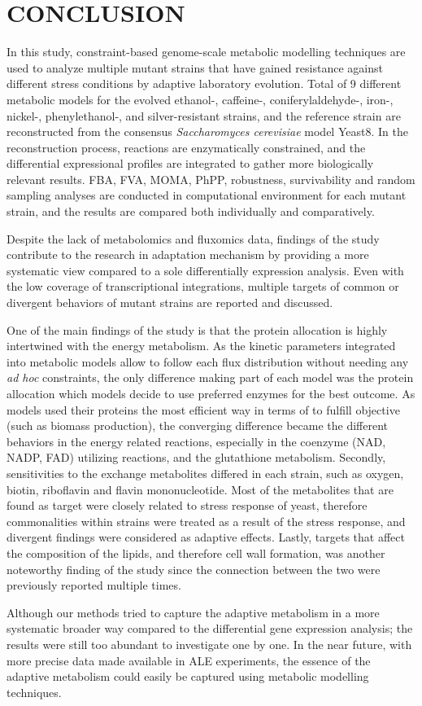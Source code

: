 
\chapter{CONCLUSION}

In this study, constraint-based genome-scale metabolic modelling techniques are used to analyze multiple mutant strains that have gained resistance against different stress conditions by adaptive laboratory evolution. Total of 9 different metabolic models for the evolved ethanol-, caffeine-, coniferylaldehyde-, iron-, nickel-, phenylethanol-, and silver-resistant strains, and the reference strain are reconstructed from the consensus \emph{Saccharomyces cerevisiae} model Yeast8. In the reconstruction process, reactions are enzymatically constrained, and the differential expressional profiles are integrated to gather more biologically relevant results. FBA, FVA, MOMA, PhPP, robustness, survivability and random sampling analyses are conducted in computational environment for each mutant strain, and the results are compared both individually and comparatively.

Despite the lack of metabolomics and fluxomics data, findings of the study contribute to the research in adaptation mechanism by providing a more systematic view compared to a sole differentially expression analysis. Even with the low coverage of transcriptional integrations, multiple targets of common or divergent behaviors of mutant strains are reported and discussed.

One of the main findings of the study is that the protein allocation is highly intertwined with the energy metabolism. As the kinetic parameters integrated into metabolic models allow to follow each flux distribution without needing any \emph{ad hoc} constraints, the only difference making part of each model was the protein allocation which models decide to use preferred enzymes for the best outcome. As models used their proteins the most efficient way in terms of to fulfill objective (such as biomass production), the converging difference became the different behaviors in the energy related reactions, especially in the coenzyme (NAD, NADP, FAD) utilizing reactions, and the glutathione metabolism. Secondly, sensitivities to the exchange metabolites differed in each strain, such as oxygen, biotin, riboflavin and flavin mononucleotide. Most of the metabolites that are found as target were closely related to stress response of yeast, therefore commonalities within strains were treated as a result of the stress response, and divergent findings were considered as adaptive effects. Lastly, targets that affect the composition of the lipids, and therefore cell wall formation, was another noteworthy finding of the study since the connection between the two were previously reported multiple times.

Although our methods tried to capture the adaptive metabolism in a more systematic broader way compared to the differential gene expression analysis; the results were still too abundant to investigate one by one. In the near future, with more precise data made available in ALE experiments, the essence of the adaptive metabolism could easily be captured using metabolic modelling techniques.
